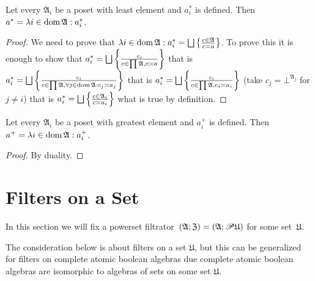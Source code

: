 \begin{prop}
Let every $\mathfrak{A}_{i}$ be a poset with least element and $a_{i}^{\ast}$
is defined. Then $a^{\ast}=\lambda i\in\operatorname{dom}\mathfrak{A}:a_{i}^{\ast}$.\end{prop}
\begin{proof}
We need to prove that $\lambda i\in\operatorname{dom}\mathfrak{A}:a_{i}^{\ast}=\bigsqcup\left\{ \frac{c\in\mathfrak{A}}{c\asymp a}\right\}$.
To prove this it is enough to show that $a_{i}^{\ast}=\bigsqcup\left\{ \frac{c_{i}}{c\in\prod\mathfrak{A},c\asymp a}\right\}$
that is $a_{i}^{\ast}=\bigsqcup\left\{ \frac{c_{i}}{c\in\prod\mathfrak{A},\forall j\in\operatorname{dom}\mathfrak{A}:c_{j}\asymp a_{j}}\right\}$
that is $a_{i}^{\ast}=\bigsqcup\left\{ \frac{c_{i}}{c\in\prod\mathfrak{A},c_{i}\asymp a_{i}}\right\}$
(take $c_{j}=\bot^{\mathfrak{A}_j}$ for $j\neq i$) that is $a_{i}^{\ast}=\bigsqcup\left\{ \frac{c\in\mathfrak{A}_{i}}{c\asymp a_{i}}\right\}$
what is true by definition.\end{proof}
\begin{cor}
Let every $\mathfrak{A}_{i}$ be a poset with greatest element and
$a_{i}^{+}$ is defined. Then $a^{+}=\lambda i\in\operatorname{dom}\mathfrak{A}:a_{i}^{+}$.\end{cor}
\begin{proof}
By duality.
\end{proof}

\section{Filters on a Set}

In this section we will fix a powerset filtrator~$(\mathfrak{A};\mathfrak{Z})=(\mathfrak{A};\mathscr{P}\mathfrak{U})$
for some set~$\mathfrak{U}$.

The consideration below is about filters on a set $\mathfrak{U}$,
but this can be generalized for filters on complete atomic boolean
algebras due complete atomic boolean algebras are isomorphic to algebras
of sets on some set $\mathfrak{U}$.


